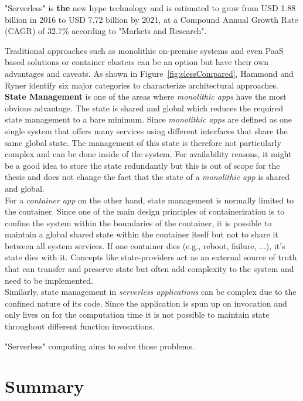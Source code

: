 "Serverless" is \textbf{the} new hype technology and is estimated to grow from USD 1.88 billion in 2016 to USD 7.72 billion by 2021, at a Compound Annual Growth Rate (CAGR) of 32.7\% according to "Markets and Research".\autocite{2017Function-as-a-Service2021} 

Traditional approaches such as monolithic on-premise systems and even \acf{PaaS} based solutions or container clusters can be an option but have their own advantages and caveats. As shown in Figure~\vref{fig:slessCompared}, Hammond and Ryner identify six major categories to characterize architectural approaches.\\
\textbf{State Management} is one of the areas where \textit{monolithic apps} have the most obvious advantage. The state is shared and global which reduces the required state management to a bare minimum. Since \textit{monolithic apps} are defined as one single system that offers many services using different interfaces that share the same global state. \autocite{Villamizar2015EvaluatingCloud} The management of this state is therefore not particularly complex and can be done inside of the system. For availability reasons, it might be a good idea to store the state redundantly but this is out of scope for the thesis and does not change the fact that the state of a \textit{monolithic app} is shared and global.\\
For a \textit{container app} on the other hand, state management is normally limited to the container. Since one of the main design principles of containerization is to confine the system within the boundaries of the container, it is possible to maintain a global shared state within the container itself but not to share it between all system services. If one container dies (e.g., reboot, failure, ...), it's state dies with it. Concepts like state-providers act as an external source of truth that can transfer and preserve state but often add complexity to the system and need to be implemented.\autocite{Ling2004SessionState}\\
Similarly, state management in \textit{serverless applications} can be complex due to the confined nature of its code. Since the application is spun up on invocation and only lives on for the computation time it is not possible to maintain state throughout different function invocations.

"Serverless" computing aims to solve those problems.\autocite{Roberts2016ServerlessArchitectures}


\section{Summary}\label{chp:backgroundEND}
